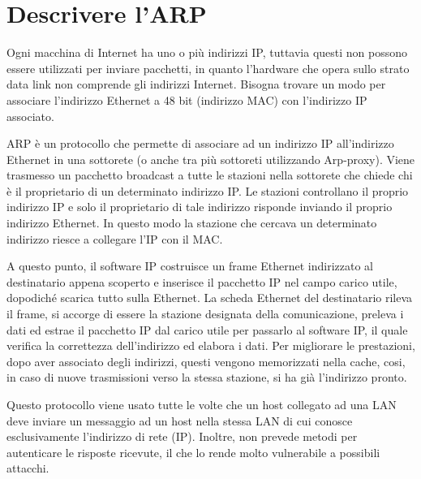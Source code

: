 \section{Descrivere l’ARP}
Ogni macchina di Internet ha uno o più indirizzi IP, tuttavia questi non possono essere utilizzati per inviare pacchetti, in quanto l’hardware che opera sullo strato data link non comprende gli indirizzi Internet.
Bisogna trovare un modo per associare l’indirizzo Ethernet a 48 bit (indirizzo MAC) con l’indirizzo IP associato.

ARP è un protocollo che permette di associare ad un indirizzo IP all’indirizzo Ethernet in una sottorete (o anche tra più sottoreti utilizzando Arp-proxy).
Viene trasmesso un pacchetto broadcast a tutte le stazioni nella sottorete che chiede chi è il proprietario di un determinato indirizzo IP. Le stazioni controllano il proprio indirizzo IP e solo il proprietario di tale indirizzo risponde inviando il proprio indirizzo Ethernet. In questo modo la stazione che cercava un determinato indirizzo riesce a collegare l’IP con il MAC.

A questo punto, il software IP costruisce un frame Ethernet indirizzato al destinatario appena scoperto e inserisce il pacchetto IP nel campo carico utile, dopodiché scarica tutto sulla Ethernet. 
La scheda Ethernet del destinatario rileva il frame, si accorge di essere la stazione designata della comunicazione, preleva i dati ed estrae il pacchetto IP dal carico utile per passarlo al software IP, il quale verifica la correttezza dell’indirizzo ed elabora i dati.
Per migliorare le prestazioni, dopo aver associato degli indirizzi, questi vengono memorizzati nella cache, cosi, in caso di nuove trasmissioni verso la stessa stazione, si ha già l’indirizzo pronto.

Questo protocollo viene usato tutte le volte che un host collegato ad una LAN deve inviare un messaggio ad un host nella stessa LAN di cui conosce esclusivamente l’indirizzo di rete (IP). Inoltre, non prevede metodi per autenticare le risposte ricevute, il che lo rende molto vulnerabile a possibili attacchi.

